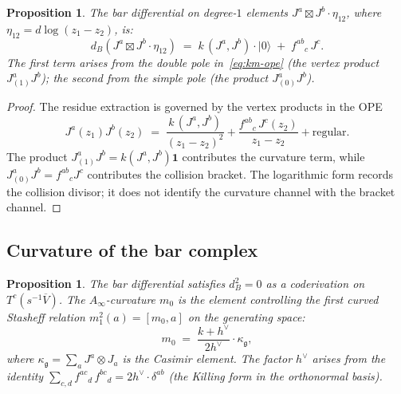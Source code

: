 \documentclass[11pt]{article}
\theoremstyle{plain}
\newtheorem{proposition}[theorem]{Proposition}
\theoremstyle{definition}
\theoremstyle{remark}
\newcommand{\fg}{\mathfrak{g}}
\numberwithin{equation}{section}
\begin{document}
\begin{proposition}\label{prop:bar-diff-km}
The bar differential on degree-$1$ elements
$J^a \boxtimes J^b \cdot \eta_{12}$, where
$\eta_{12} = d\log(z_1 - z_2)$, is:
\begin{equation}\label{eq:bar-diff}
d_B(J^a \boxtimes J^b \cdot \eta_{12})
\;=\; k\,(J^a, J^b) \cdot |0\rangle
\;+\; f^{ab}{}_{c}\, J^c.
\end{equation}
The first term arises from the double pole in~\eqref{eq:km-ope}
\textup{(}the vertex product \(J^a_{(1)}J^b\)\textup{)}; the second
from the simple pole \textup{(}the product \(J^a_{(0)}J^b\)\textup{)}.
\end{proposition}

\begin{proof}
The residue extraction is governed by the vertex products in the OPE
\[
J^a(z_1) J^b(z_2)
\;=\; \frac{k\,(J^a, J^b)}{(z_1{-}z_2)^2}
+ \frac{f^{ab}{}_c\, J^c(z_2)}{z_1{-}z_2}
+ \text{regular}.
\]
The product \(J^a_{(1)}J^b=k(J^a,J^b)\mathbf 1\) contributes the
curvature term, while \(J^a_{(0)}J^b=f^{ab}{}_cJ^c\) contributes the
collision bracket. The logarithmic form records the collision
divisor; it does not identify the curvature channel with the bracket
channel.
\end{proof}

\subsection{Curvature of the bar complex}

\begin{proposition}\label{prop:bar-curvature}
The bar differential satisfies $d_B^2 = 0$ as a coderivation
on $T^c(s^{-1}\overline{V})$. The $A_\infty$-curvature
$m_0$ is the element controlling the first curved Stasheff relation
\(m_1^2(a)=[m_0,a]\) on the generating space:
\begin{equation}\label{eq:curvature-km}
m_0 \;=\; \frac{k + h^\vee}{2h^\vee} \cdot \kappa_{\fg},
\end{equation}
where $\kappa_{\fg} = \sum_a J^a \otimes J_a$ is the
Casimir element. The factor $h^\vee$ arises from the
identity $\sum_{c,d} f^{ac}{}_d\, f^{bc}{}_d
= 2h^\vee \cdot \delta^{ab}$
\textup{(}the Killing form in the orthonormal
basis\textup{)}.
\end{proposition}
\end{document}
